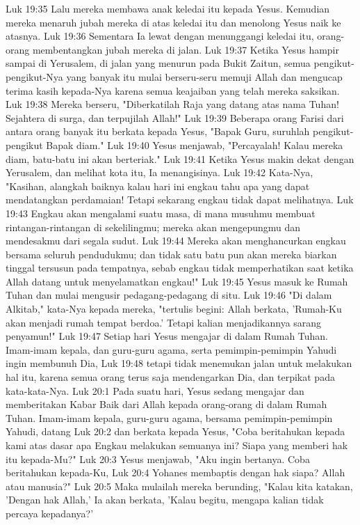 Luk 19:35  Lalu mereka membawa anak keledai itu kepada Yesus. Kemudian mereka menaruh jubah mereka di atas keledai itu dan menolong Yesus naik ke atasnya.
Luk 19:36  Sementara Ia lewat dengan menunggangi keledai itu, orang-orang membentangkan jubah mereka di jalan.
Luk 19:37  Ketika Yesus hampir sampai di Yerusalem, di jalan yang menurun pada Bukit Zaitun, semua pengikut-pengikut-Nya yang banyak itu mulai berseru-seru memuji Allah dan mengucap terima kasih kepada-Nya karena semua keajaiban yang telah mereka saksikan.
Luk 19:38  Mereka berseru, "Diberkatilah Raja yang datang atas nama Tuhan! Sejahtera di surga, dan terpujilah Allah!"
Luk 19:39  Beberapa orang Farisi dari antara orang banyak itu berkata kepada Yesus, "Bapak Guru, suruhlah pengikut-pengikut Bapak diam."
Luk 19:40  Yesus menjawab, "Percayalah! Kalau mereka diam, batu-batu ini akan berteriak."
Luk 19:41  Ketika Yesus makin dekat dengan Yerusalem, dan melihat kota itu, Ia menangisinya.
Luk 19:42  Kata-Nya, "Kasihan, alangkah baiknya kalau hari ini engkau tahu apa yang dapat mendatangkan perdamaian! Tetapi sekarang engkau tidak dapat melihatnya.
Luk 19:43  Engkau akan mengalami suatu masa, di mana musuhmu membuat rintangan-rintangan di sekelilingmu; mereka akan mengepungmu dan mendesakmu dari segala sudut.
Luk 19:44  Mereka akan menghancurkan engkau bersama seluruh pendudukmu; dan tidak satu batu pun akan mereka biarkan tinggal tersusun pada tempatnya, sebab engkau tidak memperhatikan saat ketika Allah datang untuk menyelamatkan engkau!"
Luk 19:45  Yesus masuk ke Rumah Tuhan dan mulai mengusir pedagang-pedagang di situ.
Luk 19:46  "Di dalam Alkitab," kata-Nya kepada mereka, "tertulis begini: Allah berkata, 'Rumah-Ku akan menjadi rumah tempat berdoa.' Tetapi kalian menjadikannya sarang penyamun!"
Luk 19:47  Setiap hari Yesus mengajar di dalam Rumah Tuhan. Imam-imam kepala, dan guru-guru agama, serta pemimpin-pemimpin Yahudi ingin membunuh Dia,
Luk 19:48  tetapi tidak menemukan jalan untuk melakukan hal itu, karena semua orang terus saja mendengarkan Dia, dan terpikat pada kata-kata-Nya.
Luk 20:1  Pada suatu hari, Yesus sedang mengajar dan memberitakan Kabar Baik dari Allah kepada orang-orang di dalam Rumah Tuhan. Imam-imam kepala, guru-guru agama, bersama pemimpin-pemimpin Yahudi, datang
Luk 20:2  dan berkata kepada Yesus, "Coba beritahukan kepada kami atas dasar apa Engkau melakukan semuanya ini? Siapa yang memberi hak itu kepada-Mu?"
Luk 20:3  Yesus menjawab, "Aku ingin bertanya. Coba beritahukan kepada-Ku,
Luk 20:4  Yohanes membaptis dengan hak siapa? Allah atau manusia?"
Luk 20:5  Maka mulailah mereka berunding, "Kalau kita katakan, 'Dengan hak Allah,' Ia akan berkata, 'Kalau begitu, mengapa kalian tidak percaya kepadanya?'
